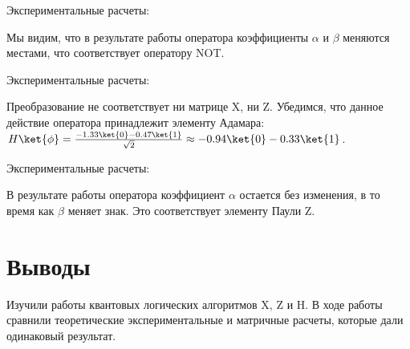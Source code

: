 \documentclass{article}
\begin{document}
Экспериментальные расчеты:

\begin{figure}[H]
\end{figure}

Мы видим, что в результате работы оператора коэффициенты $\alpha$ и $\beta$
меняются местами, что соответствует оператору NOT.

Экспериментальные расчеты:

\begin{figure}[H]
\end{figure}

Преобразование не соответствует ни матрице X, ни Z. Убедимся, что данное
действие оператора принадлежит элементу Адамара: $H\ket{\phi} =
\frac{-1.33\ket{0}-0.47\ket{1}}{\sqrt{2}}\approx -0.94\ket{0}-0.33\ket{1}$.

Экспериментальные расчеты:

\begin{figure}[H]
\end{figure}

В результате работы оператора коэффициент $\alpha$ остается без изменения, в то
время как $\beta$ меняет знак. Это соответствует элементу Паули Z.\\

\section{Выводы}

Изучили работы квантовых логических алгоритмов X, Z и H. В ходе работы
сравнили теоретические экспериментальные и матричные расчеты, которые дали
одинаковый результат.
\end{document}
